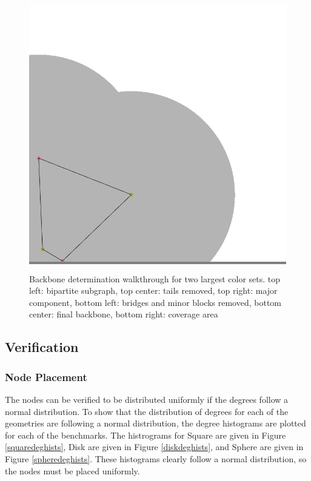 \documentclass{article}
\begin{document}
\begin{figure}
\begin{minipage}{0.3\textwidth}
            \end{minipage}
            \hspace{\fill}
            \begin{minipage}{0.3\textwidth}
            \colorbox{gray}{\includegraphics[width=\linewidth]{./images/backbone-coverage-wt.png}}
            \end{minipage}

            \caption{Backbone determination walkthrough for two largest color sets. top left: bipartite subgraph, top center: tails removed, top right: major component, bottom left: bridges and minor blocks removed, bottom center: final backbone, bottom right: coverage area}
            \label{wtbackbone}
        \end{figure}

    \subsection{Verification}

        \subsubsection{Node Placement}
        The nodes can be verified to be distributed uniformly if the degrees follow a normal distribution. To show that the distribution of degrees for each of the geometries are following a normal distribution, the degree histograms are plotted for each of the benchmarks. The histrograms for Square are given in Figure \ref{squaredeghists}, Disk are given in Figure \ref{diskdeghists}, and Sphere are given in Figure \ref{spheredeghists}. These histograms clearly follow a normal distribution, so the nodes must be placed uniformly.
\end{document}
